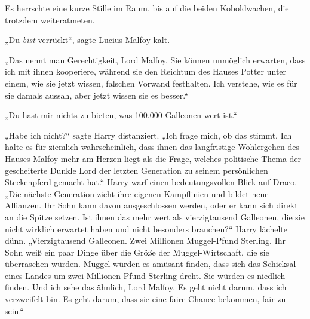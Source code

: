 Es herrschte eine kurze Stille im Raum, bis auf die beiden Koboldwachen, die trotzdem weiteratmeten.

„Du \emph{bist} verrückt“, sagte Lucius Malfoy kalt.

„Das nennt man Gerechtigkeit, Lord Malfoy. Sie können unmöglich erwarten, dass ich mit ihnen kooperiere, während sie den Reichtum des Hauses Potter unter einem, wie sie jetzt wissen, falschen Vorwand festhalten. Ich verstehe, wie es für sie damals aussah, aber jetzt wissen sie es besser.“

„Du hast mir nichts zu bieten, was 100.000 Galleonen wert ist.“

„Habe ich nicht?“ sagte Harry distanziert.
„Ich frage mich, ob das stimmt. Ich halte es für ziemlich wahrscheinlich, dass ihnen das langfristige Wohlergehen des Hauses Malfoy mehr am Herzen liegt als die Frage, welches politische Thema der gescheiterte Dunkle Lord der letzten Generation zu seinem persönlichen Steckenpferd gemacht hat.“
Harry warf einen bedeutungsvollen Blick auf Draco.
„Die nächste Generation zieht ihre eigenen Kampflinien und bildet neue Allianzen. Ihr Sohn kann davon ausgeschlossen werden, oder er kann sich direkt an die Spitze setzen. Ist ihnen das mehr wert als vierzigtausend Galleonen, die sie nicht wirklich erwartet haben und nicht besonders brauchen?“ Harry lächelte dünn.
„Vierzigtausend Galleonen. Zwei Millionen Muggel-Pfund Sterling. Ihr Sohn weiß ein paar Dinge über die Größe der Muggel-Wirtschaft, die sie überraschen würden. Muggel würden es amüsant finden, dass sich das Schicksal eines Landes um zwei Millionen Pfund Sterling dreht. Sie würden es niedlich finden. Und ich sehe das ähnlich, Lord Malfoy. Es geht nicht darum, dass ich verzweifelt bin. Es geht darum, dass sie eine faire Chance bekommen, fair zu sein.“

